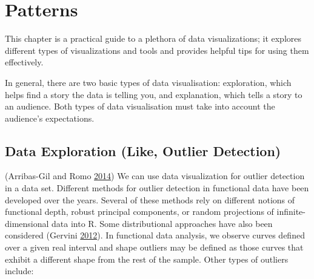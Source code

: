\documentclass[]{book}
\begin{document}
\hypertarget{patterns}{%
\chapter{Patterns}\label{patterns}}

This chapter is a practical guide to a plethora of data visualizations; it explores different types of visualizations and tools and provides helpful tips for using them effectively.

In general, there are two basic types of data visualisation: exploration, which helps find a story the data is telling you, and explanation, which tells a story to an audience. Both types of data visualisation must take into account the audience's expectations.

\hypertarget{data-exploration-like-outlier-detection}{%
\section{Data Exploration (Like, Outlier Detection)}\label{data-exploration-like-outlier-detection}}

(Arribas-Gil and Romo \protect\hyperlink{ref-outliar}{2014})
We can use data visualization for outlier detection in a data set. Different methods for outlier detection in functional data have been developed over the years. Several of these methods rely on different notions of functional depth, robust principal components, or random projections of infinite-dimensional data into R. Some distributional approaches have also been considered (Gervini \protect\hyperlink{ref-Gervini}{2012}). In functional data analysis, we observe curves defined over a given real interval and shape outliers may be defined as those curves that exhibit a different shape from the rest of the sample. Other types of outliers include:
\end{document}
